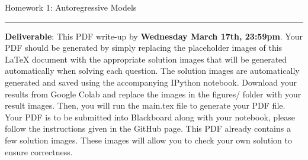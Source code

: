 \documentclass{article}
\newcommand{\ruleskip}{\bigskip\hrule\bigskip}
\begin{document}
\pagestyle{myheadings} 

{\huge
\noindent Homework 1: Autoregressive Models}
\ruleskip

{\bf Deliverable}: This PDF write-up by {\bf Wednesday March 17th, 23:59pm}.  Your PDF should be generated by simply replacing the placeholder images of this LaTeX document with the appropriate solution images that will be generated automatically when solving each question. The solution images are automatically generated and saved using the accompanying IPython notebook. Download your results from Google Colab and replace the images in the figures/ folder with your result images. Then, you will run the main.tex file to generate your PDF file. Your PDF is to be submitted into Blackboard along with your notebook, please follow the instructions given in the GitHub page. This PDF already contains a few solution images.  These images will allow you to check your own solution to ensure correctness.


\vspace{.2in}

\end{document}
